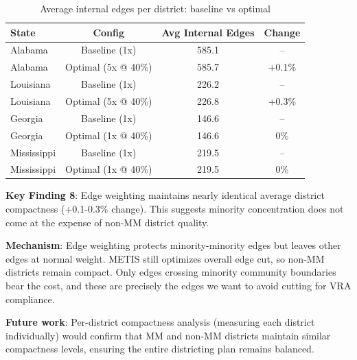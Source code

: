 \begin{table}[h]
\centering
\begin{tabular}{lccc}
\toprule
State & Config & Avg Internal Edges & Change \\
\midrule
Alabama & Baseline (1x) & 585.1 & -- \\
Alabama & Optimal (5x @ 40\%) & 585.7 & +0.1\% \\
Louisiana & Baseline (1x) & 226.2 & -- \\
Louisiana & Optimal (5x @ 40\%) & 226.8 & +0.3\% \\
Georgia & Baseline (1x) & 146.6 & -- \\
Georgia & Optimal (1x @ 40\%) & 146.6 & 0\% \\
Mississippi & Baseline (1x) & 219.5 & -- \\
Mississippi & Optimal (1x @ 40\%) & 219.5 & 0\% \\
\bottomrule
\end{tabular}
\caption{Average internal edges per district: baseline vs optimal}
\label{tab:district_compactness}
\end{table}

\textbf{Key Finding 8}: Edge weighting maintains nearly identical average district compactness (+0.1-0.3\% change). This suggests minority concentration does not come at the expense of non-MM district quality.

\textbf{Mechanism}: Edge weighting protects minority-minority edges but leaves other edges at normal weight. METIS still optimizes overall edge cut, so non-MM districts remain compact. Only edges crossing minority community boundaries bear the cost, and these are precisely the edges we want to avoid cutting for VRA compliance.

\textbf{Future work}: Per-district compactness analysis (measuring each district individually) would confirm that MM and non-MM districts maintain similar compactness levels, ensuring the entire districting plan remains balanced.

